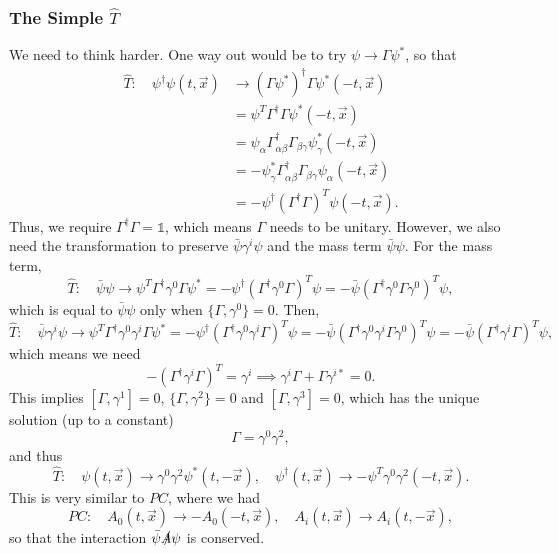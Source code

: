 \documentclass[11pt]{article}
\theoremstyle{definition}
\begin{document}
\subsubsection{The Simple $\hat{T}$}
We need to think harder. One way out would be to try $\psi \to \Gamma\psi^*$, so that
\begin{equation}
\begin{aligned}
    \hat{T}: \quad \psi^\dagger\psi(t,\vec{x}) &\to (\Gamma\psi^*)^\dagger\Gamma\psi^*(-t,\vec{x})\\
    &= \psi^T\Gamma^\dagger\Gamma\psi^*(-t,\vec{x})\\
    &= \psi_\alpha\Gamma_{\alpha\beta}^\dagger\Gamma_{\beta
    \gamma}\psi_{\gamma}^*(-t,\vec{x})\\
    &= -\psi_\gamma^*\Gamma_{\alpha\beta}^\dagger\Gamma_{\beta
    \gamma}\psi_{\alpha}(-t,\vec{x})\\
    &= -\psi^\dagger(\Gamma^\dagger\Gamma)^T\psi(-t,\vec{x}).
\end{aligned}
\end{equation}
Thus, we require $\Gamma^\dagger\Gamma = \mathds{1}$, which means $\Gamma$ needs to be unitary. However, we also need the transformation to preserve $\bar{\psi}\gamma^i\psi$ and the mass term $\bar{\psi}\psi$. For the mass term, 
\begin{equation}
    \hat{T}:\quad \bar{\psi}\psi \to \psi^T\Gamma^\dagger\gamma^0\Gamma\psi^* = -\psi^\dagger(\Gamma^\dagger\gamma^0\Gamma)^T\psi = -\bar{\psi}(\Gamma^\dagger\gamma^0\Gamma\gamma^0)^T\psi,
\end{equation}
which is equal to $\bar{\psi}\psi$ only when $\{\Gamma, \gamma^0\} = 0$. Then,
\begin{equation}
    \hat{T}:\quad \bar{\psi}\gamma^i\psi \to \psi^T\Gamma^\dagger\gamma^0\gamma^i\Gamma\psi^* = -\psi^\dagger(\Gamma^\dagger\gamma^0\gamma^i\Gamma)^T\psi = -\bar{\psi}(\Gamma^\dagger\gamma^0\gamma^i\Gamma\gamma^0)^T\psi = -\bar{\psi}(\Gamma^\dagger\gamma^i\Gamma)^T\psi,
\end{equation}
which means we need
\begin{equation}
    -(\Gamma^\dagger\gamma^i\Gamma)^T = \gamma^i \implies \gamma^i\Gamma + \Gamma\gamma^{i*} = 0.
\end{equation}
This implies $[\Gamma,\gamma^1]=0$, $\{\Gamma,\gamma^2\}=0$ and $[\Gamma,\gamma^3]=0$, which has the unique solution (up to a constant)
\begin{equation}
    \Gamma = \gamma^0 \gamma^2,
\end{equation}
and thus
\begin{equation}
    \hat{T}: \quad \psi(t,\vec{x}) \to  \gamma^0 \gamma^2\psi^*(t,-\vec{x}), \quad  \psi^\dagger(t,\vec{x}) \to  -\psi^T\gamma^0 \gamma^2(-t,\vec{x}).
\end{equation}
This is very similar to $PC$, where we had
\begin{equation}
    PC: \quad A_0(t,\vec{x}) \to -A_0(-t,\vec{x}), \quad A_i(t,\vec{x}) \to A_i(t,-\vec{x}),
\end{equation}
so that the interaction $\bar\psi\slashed{A}\psi$ is conserved.
\end{document}
